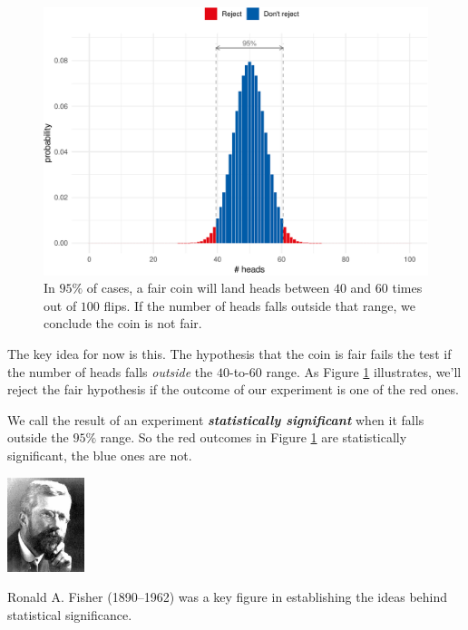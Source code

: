 \documentclass[justified]{tufte-book}
\theoremstyle{definition}
\theoremstyle{definition}
\theoremstyle{definition}
\theoremstyle{definition}
\theoremstyle{remark}
\begin{document}
\begin{figure}
\includegraphics{_main_files/figure-latex/binom100fences-1} \caption[In $95\%$ of cases, a fair coin will land heads between $40$ and $60$ times out of $100$ flips]{In $95\%$ of cases, a fair coin will land heads between $40$ and $60$ times out of $100$ flips. If the number of heads falls outside that range, we conclude the coin is not fair.}\label{fig:binom100fences}
\end{figure}

The key idea for now is this. The hypothesis that the coin is fair fails the test if the number of heads falls \emph{outside} the \(40\)-to-\(60\) range. As Figure \ref{fig:binom100fences} illustrates, we'll reject the fair hypothesis if the outcome of our experiment is one of the red ones.

We call the result of an experiment \textbf{\emph{statistically significant}} when it falls outside the \(95\%\) range. So the red outcomes in Figure \ref{fig:binom100fences} are statistically significant, the blue ones are not.

\begin{marginfigure}
\includegraphics[width=0.89in]{img/fisher} \caption[Ronald A]{Ronald A. Fisher (1890--1962) was a key figure in establishing the ideas behind statistical significance.}\label{fig:unnamed-chunk-139}
\end{marginfigure}
\end{document}
